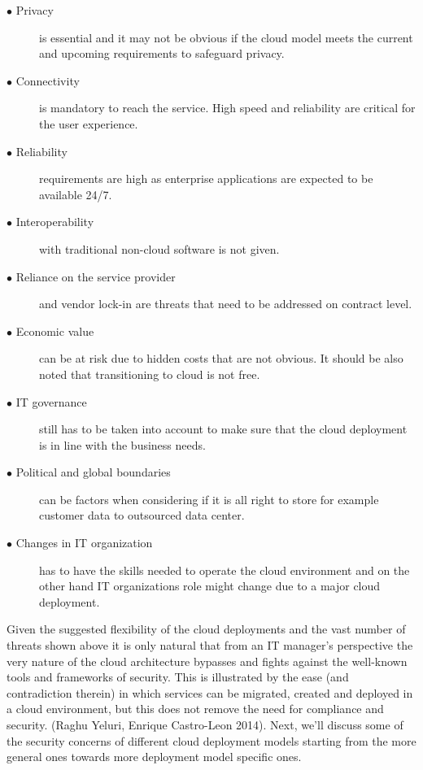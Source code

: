 \documentclass{article}
\begin{document}
\begin{description}
        \item[$\bullet$ Privacy] is essential and it may not be obvious if the cloud model meets the current and upcoming requirements to safeguard privacy.
        \item[$\bullet$ Connectivity] is mandatory to reach the service. High speed and reliability are critical for the user experience.
        \item[$\bullet$ Reliability] requirements are high as enterprise applications are expected to be available 24/7.
        \item[$\bullet$ Interoperability] with traditional non-cloud software is not given.
        \item[$\bullet$ Reliance on the service provider] and vendor lock-in are threats that need to be addressed on contract level.
        \item[$\bullet$ Economic value] can be at risk due to hidden costs that are not obvious. It should be also noted that transitioning to cloud is not free.
        \item[$\bullet$ IT governance] still has to be taken into account to make sure that the cloud deployment is in line with the business needs.
        \item[$\bullet$ Political and global boundaries] can be factors when considering if it is all right to store for example customer data to outsourced data center.
        \item[$\bullet$ Changes in IT organization] has to have the skills needed to operate the cloud environment and on the other hand IT organizations role might change due to a major cloud deployment.
\end{description}
Given the suggested flexibility of the cloud deployments and the vast number of threats shown above it is only natural that from an IT manager's perspective the very nature of the cloud architecture bypasses and fights against the well-known tools and frameworks of security.
This is illustrated by the ease (and contradiction therein) in which services can be migrated, created and deployed in a cloud environment, but this does not remove the need for compliance and security. (Raghu Yeluri, Enrique Castro-Leon 2014). 
Next, we'll discuss some of the security concerns of different cloud deployment models starting from the more general ones towards more deployment model specific ones.
\end{document}
